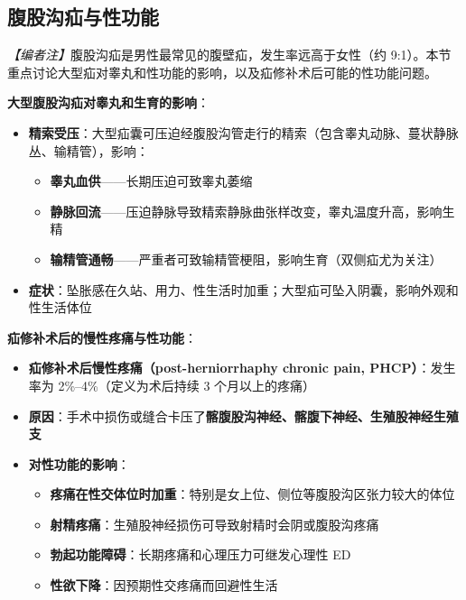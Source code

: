 \subsection{腹股沟疝与性功能}
\label{subsec:inguinal_hernia_sex}

\noindent\textit{【编者注】}腹股沟疝是男性最常见的腹壁疝，发生率远高于女性（约 9:1）。本节重点讨论大型疝对睾丸和性功能的影响，以及疝修补术后可能的性功能问题。

\vspace{0.5em}
\noindent\textbf{大型腹股沟疝对睾丸和生育的影响}：

\begin{itemize}[leftmargin=2cm]
	\item \textbf{精索受压}：大型疝囊可压迫经腹股沟管走行的精索（包含睾丸动脉、蔓状静脉丛、输精管），影响：
	\begin{itemize}
		\item \textbf{睾丸血供}——长期压迫可致睾丸萎缩
		\item \textbf{静脉回流}——压迫静脉导致精索静脉曲张样改变，睾丸温度升高，影响生精
		\item \textbf{输精管通畅}——严重者可致输精管梗阻，影响生育（双侧疝尤为关注）
	\end{itemize}
	\item \textbf{症状}：坠胀感在久站、用力、性生活时加重；大型疝可坠入阴囊，影响外观和性生活体位
\end{itemize}

\vspace{0.5em}
\noindent\textbf{疝修补术后的慢性疼痛与性功能}：

\begin{itemize}[leftmargin=2cm]
	\item \textbf{疝修补术后慢性疼痛（post-herniorrhaphy chronic pain, PHCP）}：发生率为 2\%--4\%（定义为术后持续 3 个月以上的疼痛）
	\item \textbf{原因}：手术中损伤或缝合卡压了\textbf{髂腹股沟神经、髂腹下神经、生殖股神经生殖支}
	\item \textbf{对性功能的影响}：
	\begin{itemize}
		\item \textbf{疼痛在性交体位时加重}：特别是女上位、侧位等腹股沟区张力较大的体位
		\item \textbf{射精疼痛}：生殖股神经损伤可导致射精时会阴或腹股沟疼痛
		\item \textbf{勃起功能障碍}：长期疼痛和心理压力可继发心理性 ED
		\item \textbf{性欲下降}：因预期性交疼痛而回避性生活
	\end{itemize}
\end{itemize}

